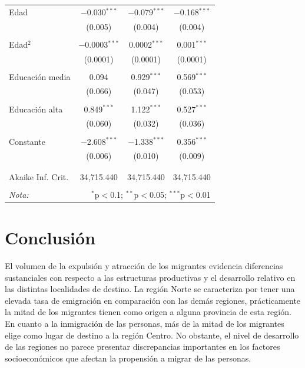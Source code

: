 \documentclass[12pt,a4paper]{article}
\begin{document}
\begin{table}[!htbp]
\begin{tabular}{@{\extracolsep{5pt}}lccc}
 Edad & $-$0.030$^{***}$ & $-$0.079$^{***}$ & $-$0.168$^{***}$ \\ 
  & (0.005) & (0.004) & (0.004) \\ 
  & & & \\ 
 Edad$^2$ & $-$0.0003$^{***}$ & 0.0002$^{***}$ & 0.001$^{***}$ \\ 
  & (0.0001) & (0.0001) & (0.0001) \\ 
  & & & \\ 
 Educación media & 0.094 & 0.929$^{***}$ & 0.569$^{***}$ \\ 
  & (0.066) & (0.047) & (0.053) \\ 
  & & & \\ 
  Educación alta & 0.849$^{***}$ & 1.122$^{***}$ & 0.527$^{***}$ \\ 
  & (0.060) & (0.032) & (0.036) \\ 
  & & & \\ 
 Constante & $-$2.608$^{***}$ & $-$1.338$^{***}$ & 0.356$^{***}$ \\ 
  & (0.006) & (0.010) & (0.009) \\ 
  & & & \\ 
\hline \\[-1.8ex] 
Akaike Inf. Crit. & 34,715.440 & 34,715.440 & 34,715.440 \\ 
\hline 
\hline \\[-1.8ex] 
\textit{Nota:}  & \multicolumn{3}{r}{$^{*}$p$<$0.1; $^{**}$p$<$0.05; $^{***}$p$<$0.01} \\ 
\end{tabular} 
\end{table} 

\newpage

\section{Conclusión}
El volumen de la expulsión y atracción de los migrantes evidencia diferencias sustanciales con respecto a las estructuras productivas y el desarrollo relativo en las distintas localidades de destino. La región Norte se caracteriza por tener una elevada tasa de emigración  en comparación con las demás regiones, prácticamente la mitad de los migrantes tienen como origen a alguna provincia de esta región. En cuanto a la inmigración de las personas, más de la mitad de los migrantes elige como lugar de destino a la región Centro. No obstante, el nivel de desarrollo de las regiones no parece presentar discrepancias importantes en los factores socioeconómicos que afectan la propensión a migrar de las personas.
\end{document}
